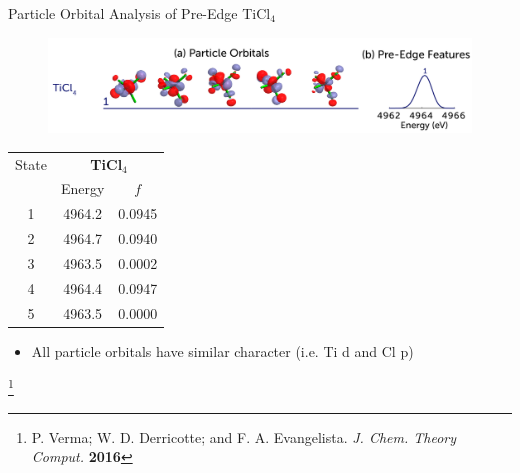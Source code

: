 \documentclass[t]{beamer}
\newcommand\blfootnote[1]{%
  \begingroup
  \renewcommand\thefootnote{}\footnote{#1}%
  \addtocounter{footnote}{-1}%
  \endgroup
}
\begin{document}
\begin{frame}{Particle Orbital Analysis of Pre-Edge TiCl$_4$}
 \begin{figure}
\includegraphics[scale=0.15]{ticl4_preedge.png}
\end{figure}
\begin{table}
\footnotesize
\begin{tabular}{c@{\hskip 1in}c@{\hskip 1in}c}
\toprule
State &   \multicolumn{2}{c}{\textbf{TiCl$_4$}}   \\
& Energy & $f$ \\
\cmidrule(r){2-3}
1 & 4964.2 & 0.0945\\
2 & 4964.7 & 0.0940\\
3 & 4963.5 & 0.0002\\
4 & 4964.4 & 0.0947\\
5 & 4963.5 & 0.0000\\
\bottomrule
\end{tabular}
\end{table}
\begin{itemize}
\item All particle orbitals have similar character (i.e. Ti d and Cl p)
\end{itemize}
\blfootnote{P. Verma; W. D. Derricotte; and F. A. Evangelista. \textit{J. Chem. Theory Comput.} \textbf{2016}}
\end{frame}
\end{document}
